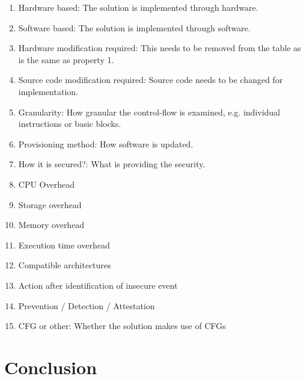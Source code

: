 \begin{enumerate}
	\item Hardware based: The solution is implemented through hardware.
	\item Software based: The solution is implemented through software.
	\item Hardware modification required: This needs to be removed from the table as is the same as property 1.
	\item Source code modification required: Source code needs to be changed for implementation.
	\item Granularity: How granular the control-flow is examined, e.g. individual instructions or basic blocks.
	\item Provisioning method: How software is updated.
	\item How it is secured?: What is providing the security.
	\item CPU Overhead
	\item Storage overhead
	\item Memory overhead
	\item Execution time overhead
	\item Compatible architectures
	\item Action after identification of insecure event
	\item Prevention / Detection / Attestation
	\item CFG or other: Whether the solution makes use of CFGs
\end{enumerate}

\ifnotesincluded
\section{Conclusion}
\fi
